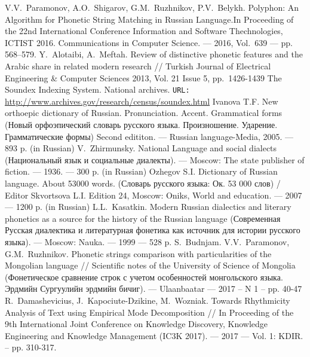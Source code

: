 \documentclass{svproc}
\begin{document}
\begin{thebibliography}{18}
 V.V.~Paramonov, A.O.~Shigarov, G.M.~Ruzhnikov, P.V.~Belykh. Polyphon: An Algorithm for Phonetic String Matching in Russian Language.In Proceeding of the 22nd International Conference Information and Software Thechnologies, ICTIST 2016. Communications in Computer Science. --- 2016, Vol.~639 --- pp. 568--579.
 Y.~Alotaibi, A.~Meftah. Review of distinctive phonetic features and the Arabic share in related modern research // Turkish Journal of Electrical Engineering \& Computer Sciences 2013, Vol. 21 Issue 5, pp.~1426-1439
	The Soundex Indexing System. National archives. \texttt{URL:} \url{http://www.archives.gov/research/census/soundex.html}
 Ivanova T.F. New orthoepic dictionary of Russian. Pronunciation. Accent. Grammatical forms (Новый орфоэпический словарь русского языка. Произношение. Ударение. Грамматические формы) Second edititon. --- Russian language-Media, 2005. --- 893 p. (in Russian)
 V.~Zhirmunsky. National Language and social dialects (Национальный язык и социальные диалекты). --- Moscow: The state publisher of fiction. --- 1936. --- 300 p. (in Russian)
 Ozhegov S.I. Dictionary of Russian language. About 53000 words. (Словарь русского языка: Ок. 53 000 слов) / Editor Skvortsova L.I. Edition 24, Moscow: Oniks, World and education. --- 2007 --- 1200 p. (in Russian)
 L.L.~Kasatkin. Modern Russian dialectics and literary phonetics as a source for the history of the Russian language (Современная Русская диалектика и литературная фонетика как источник для истории русского языка). --- Moscow: Nauka. --- 1999 --- 528 p.
 S.~Budnjam. V.V.~Paramonov, G.M.~Ruzhnikov. Phonetic strings comparison with particularities of the Mongolian language // Scientific notes of the University of Science of Mongolia (Фонетическое сравнение строк с учетом особенностей монгольского языка. Эрдмийн Сургуулийн эрдмийн бичиг). --- Ulaanbaatar --- 2017 -- N 1 -- pp. 40-47
 R.~Damashevicius, J.~Kapociute-Dzikine, M.~Wozniak. Towards Rhythmicity Analysis of Text using Empirical Mode Decomposition // In Proceeding of the 9th International Joint Conference on Knowledge Discovery, Knowledge Engineering and Knowledge Management (IC3K 2017). --- 2017 --- Vol. 1: KDIR. -- pp. 310-317.

\end{thebibliography}
\end{document}
